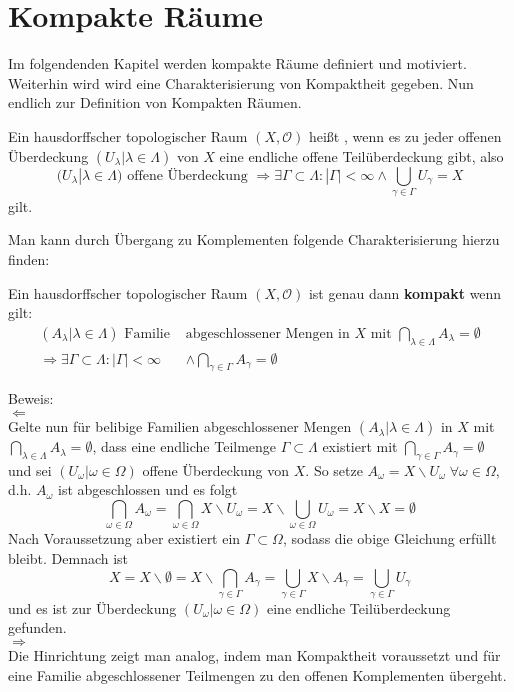 \chapter{Kompakte Räume}
Im folgendenden Kapitel werden kompakte Räume definiert und motiviert. Weiterhin wird 
wird eine Charakterisierung von Kompaktheit gegeben.
Nun endlich zur Definition von Kompakten Räumen.

\begin{Def}[Kompaktheit]
	Ein hausdorffscher topologischer Raum \((X, \mathcal{O})\) heißt , wenn es zu jeder offenen Überdeckung 
	\((U_{\lambda} | \lambda \in \Lambda)\) von \(X\) eine endliche offene Teilüberdeckung gibt, also
	\[ (U_{\lambda} | \lambda \in \Lambda) \mbox{ offene Überdeckung }
     \Rightarrow \exists \Gamma \subset \Lambda : |\Gamma| < \infty \land \bigcup_{\gamma \in \Gamma} U_{\gamma} = X \] 
	gilt.
\end{Def}
Man kann durch Übergang zu Komplementen folgende Charakterisierung hierzu finden:

\begin{Satz}
	Ein hausdorffscher topologischer Raum \((X, \mathcal{O})\) ist genau dann {\bf kompakt } wenn gilt:
	\begin{align*}
		(A_{\lambda}| \lambda \in \Lambda) \mbox{ Familie } & \mbox{abgeschlossener Mengen in } X \mbox{ mit } 
		\bigcap_{\lambda \in \Lambda} A_{\lambda} = \emptyset \\
		\Rightarrow \exists \Gamma \subset \Lambda : |\Gamma| < \infty & \land \bigcap_{\gamma \in \Gamma} A_{\gamma} = \emptyset
	\end{align*} 
\end{Satz}

Beweis:
\\
\(\Leftarrow\)
\\
Gelte nun für belibige Familien abgeschlossener Mengen \((A_{\lambda}| \lambda \in \Lambda)\) in  \(X\) mit
\(\bigcap_{\lambda \in \Lambda} A_{\lambda} = \emptyset\), dass eine endliche Teilmenge \(\Gamma \subset \Lambda\) existiert mit
\(\bigcap_{\gamma \in \Gamma} A_{\gamma} = \emptyset\) und sei \( (U_{\omega} | \omega \in \Omega) \) offene Überdeckung
von \(X\). So setze \(A_{\omega} = X \backslash U_{\omega} \; \forall \omega \in \Omega\), d.h. \(A_{\omega}\) ist abgeschlossen
und es folgt 
\[\bigcap_{\omega \in \Omega} A_{\omega} = \bigcap_{\omega \in \Omega} X \backslash U_{\omega} =  X \backslash 
\bigcup_{\omega \in \Omega} U_{\omega} = X \backslash X =  \emptyset \]
Nach Voraussetzung aber existiert ein \(\Gamma \subset \Omega\), sodass die obige Gleichung erfüllt bleibt. Demnach ist 
\[ X = X \backslash \emptyset = X \backslash \bigcap_{\gamma \in \Gamma} A_{\gamma} = \bigcup_{\gamma \in \Gamma} X \backslash A_{\gamma} = 
\bigcup_{\gamma \in \Gamma} U_{\gamma} \] 
und es ist zur Überdeckung \( (U_{\omega} | \omega \in \Omega) \) eine endliche Teilüberdeckung gefunden.
\\
\(\Rightarrow\)
\\
Die Hinrichtung zeigt man analog, indem man Kompaktheit voraussetzt und für eine Familie abgeschlossener Teilmengen zu den 
offenen Komplementen übergeht.

